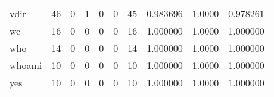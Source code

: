 \begin{tabular}{lrrrrrrrrr}
vdir      &                                       46 &                                                  0 &                                                  1 &                                                  0 &                                                  0 &                                                 45 &                                           0.983696 &                                 1.0000 &                             0.978261 \\
wc        &                                       16 &                                                  0 &                                                  0 &                                                  0 &                                                  0 &                                                 16 &                                           1.000000 &                                 1.0000 &                             1.000000 \\
who       &                                       14 &                                                  0 &                                                  0 &                                                  0 &                                                  0 &                                                 14 &                                           1.000000 &                                 1.0000 &                             1.000000 \\
whoami    &                                       10 &                                                  0 &                                                  0 &                                                  0 &                                                  0 &                                                 10 &                                           1.000000 &                                 1.0000 &                             1.000000 \\
yes       &                                       10 &                                                  0 &                                                  0 &                                                  0 &                                                  0 &                                                 10 &                                           1.000000 &                                 1.0000 &                             1.000000 \\
\bottomrule
\end{tabular}
